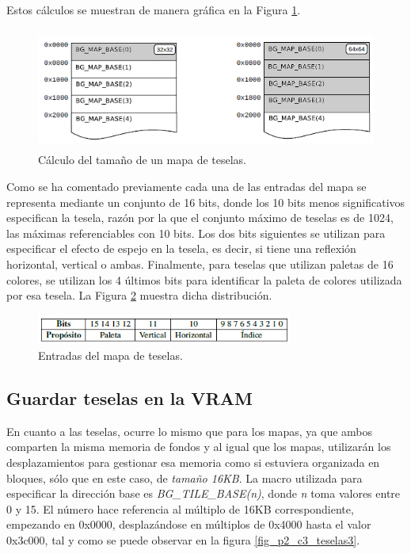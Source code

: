 Estos cálculos se muestran de manera gráfica en la Figura \ref{fig_p2_c3_teselas2b}.

\begin{figure}[t]
\centering
\includegraphics[height=4cm]{Figuras/C7/c7_mem_teselas2.PNG}
\caption{Cálculo del tamaño de un mapa de teselas.}
\label{fig_p2_c3_teselas2b}
\end{figure}

Como se ha comentado previamente cada una de las entradas del mapa se representa mediante un conjunto de 16 bits, donde los 10 bits menos significativos especifican la tesela, razón por la que el conjunto máximo de teselas es de  1024, las máximas referenciables con 10 bits. Los dos bits siguientes se utilizan para especificar el efecto de espejo en la tesela, es decir, si tiene una reflexión horizontal, vertical o ambas. Finalmente, para teselas que utilizan paletas de 16 colores, se utilizan los 4 últimos bits para identificar la paleta de colores utilizada por esa tesela. La Figura \ref{fig_p2_c3_entmapateselas} muestra dicha distribución.

\begin{figure}[t]
\centering
\includegraphics[height=1cm]{Figuras/C7/c7_bits_teselas.PNG}
\caption{Entradas del mapa de teselas.}
\label{fig_p2_c3_entmapateselas}
\end{figure}

\subsection{Guardar teselas en la VRAM}
En cuanto a las teselas, ocurre lo mismo que para los mapas, ya que ambos comparten la misma memoria de fondos y al igual que los mapas, utilizarán los desplazamientos para gestionar esa memoria como si estuviera organizada en bloques, sólo que en este caso, de \textit{tamaño 16KB}. La macro utilizada para especificar la dirección base es \textit{BG\_TILE\_BASE(n)}, donde \textit{n} toma valores entre 0 y 15. El número hace referencia al múltiplo de 16KB correspondiente, empezando en 0x0000, desplazándose en múltiplos de 0x4000 hasta el valor 0x3c000, tal y como se puede observar en la figura \ref{fig_p2_c3_teselas3}. 


